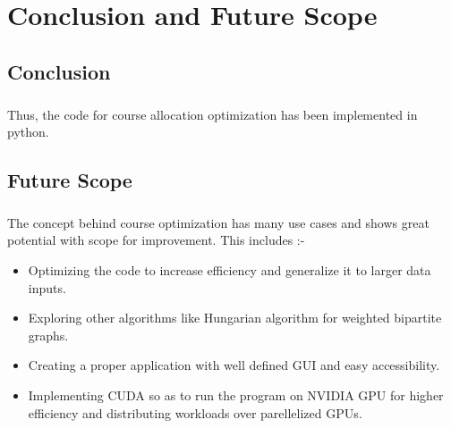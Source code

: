 \chapter{Conclusion and Future Scope}
\section{Conclusion}
\paragraph{} Thus, the code for course allocation optimization has been implemented in python.
\section{Future Scope}
\paragraph{} The concept behind course optimization has many use cases and shows great potential with scope for improvement. This includes :-
\begin{itemize}
 \item Optimizing the code to increase efficiency and generalize it to larger data inputs.
 \item Exploring other algorithms like Hungarian algorithm for weighted bipartite graphs.
 \item Creating a proper application with well defined GUI and easy accessibility.
 \item Implementing CUDA so as to run the program on NVIDIA GPU for higher efficiency and distributing workloads over parellelized GPUs.
\end{itemize}